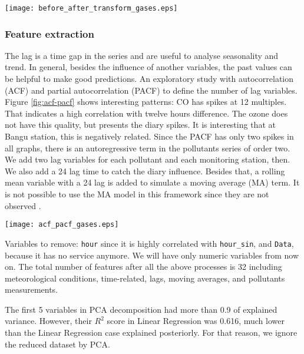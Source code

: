 \begin{figure*}
    \centering
    \texttt{[image: before\_after\_transform\_gases.eps]}
    \caption{Gases distribution before and after the power transform.}
    \label{fig:before-after-transform}
\end{figure*}
 
\subsubsection{Feature extraction}

The lag is a time gap in the series and are useful to analyse seasonality and trend. In
general, besides the influence of another variables, the past values can be
helpful to make good predictions. An exploratory study with autocorrelation
(ACF) and partial autocorrelation (PACF) to define the number of lag
variables. Figure \ref{fig:acf-pacf} shows interesting patterns: CO has spikes
at 12 multiples. That indicates a high correlation with twelve hours
difference. The ozone does not have this quality, but presents the diary
spikes. It is interesting that at Bangu station, this is negatively related.
Since the PACF has only two spikes in all graphs, there is an autoregressive
term in the pollutants series of order two. We add two lag variables for each
pollutant and each monitoring station, then. We also add a 24 lag time to
catch the diary influence. Besides that, a rolling mean variable with a 24 lag
is added to simulate a moving average (MA) term. It is not possible to use the MA
model in this framework since they are not observed \cite{liang2020machine}. 

\begin{figure*}
    \centering
    \texttt{[image: acf\_pacf\_gases.eps]}
    \caption{ACF and PACF plots for CO, O$_3$, and PM$_{10}$ at Copacabana and
    Bangu stations. }
    \label{fig:acf-pacf}
\end{figure*}

Variables to remove: {\tt hour} since it is highly correlated with {\tt hour\_sin}, and {\tt Data}, because it has no service anymore. We will have
only numeric variables from now on. The total number of features after all
the above processes is 32 including meteorological conditions, time-related,
lags, moving averages, 
and pollutants measurements.

\begin{remark}
    The first 5 variables in PCA decomposition had more than 0.9 of explained
    variance. However, their $R^2$ score in Linear Regression was 0.616, much
    lower than the Linear Regression case explained posteriorly. For that
    reason, we ignore the reduced dataset by PCA.  
\end{remark}